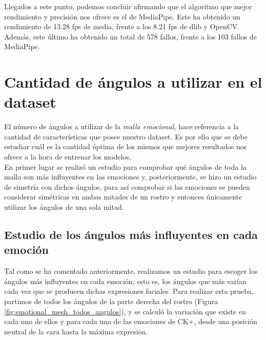 Llegados a este punto, podemos concluir afirmando que el algoritmo que mejor rendimiento y precisión nos ofrece es el de MediaPipe. Este ha obtenido un rendimiento de 13.28 fps de media, frente a los 8.21 fps de dlib y OpenCV. Además, este último ha obtenido un total de 578 fallos, frente a los 103 fallos de MediaPipe.

\section{Cantidad de ángulos a utilizar en el dataset}
\label{sec:estudio_cantidad_de_angulos}

El número de ángulos a utilizar de la \textit{malla emocional}, hace referencia a la cantidad de características que posee nuestro dataset. Es por ello que se debe estudiar cuál es la cantidad óptima de los mismos que mejores resultados nos ofrece a la hora de entrenar los modelos.\\

En primer lugar se realizó un estudio para comprobar qué ángulos de toda la malla son más influyentes en las emociones y, posteriormente, se hizo un estudio de simetría con dichos ángulos, para así comprobar si las emociones se pueden considerar simétricas en ambas mitades de un rostro y entonces únicamente utilizar los ángulos de una sola mitad.

\subsection{Estudio de los ángulos más influyentes en cada emoción}

Tal como se ha comentado anteriormente, realizamos un estudio para escoger los ángulos más influyentes en cada emoción, esto es, los ángulos que más varían cada vez que se producen dichas expresiones faciales. Para realizar esta prueba, partimos de todos los ángulos de la parte derecha del rostro (Figura \ref{fig:emotional_mesh_todos_angulos}), y se calculó la variación que existe en cada uno de ellos y para cada una de las emociones de CK+, desde una posición neutral de la cara hasta la máxima expresión.\\

